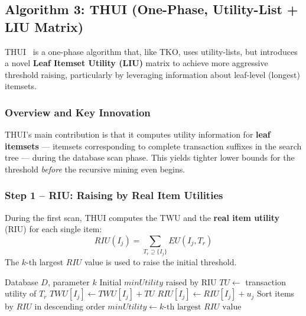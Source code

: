 \subsection{Algorithm 3: THUI (One-Phase, Utility-List + LIU Matrix)}
\label{sec:thui}

THUI~\cite{ref_thui} is a one-phase algorithm that, like TKO, uses utility-lists, but introduces a novel \textbf{Leaf Itemset Utility (LIU)} matrix to achieve more aggressive threshold raising, particularly by leveraging information about leaf-level (longest) itemsets.

\subsubsection{Overview and Key Innovation}

THUI's main contribution is that it computes utility information for \textbf{leaf itemsets} --- itemsets corresponding to complete transaction suffixes in the search tree --- during the database scan phase. This yields tighter lower bounds for the threshold \textit{before} the recursive mining even begins.

\subsubsection{Step 1 -- RIU: Raising by Real Item Utilities}

During the first scan, THUI computes the TWU and the \textbf{real item utility} (RIU) for each single item:
\begin{equation}
    RIU(I_j) = \sum_{T_r \supseteq \{I_j\}} EU(I_j, T_r)
\end{equation}
The $k$-th largest $RIU$ value is used to raise the initial threshold.

\begin{algorithm}[H]
\caption{RIU Computation --- First DB Scan (Ref: \texttt{thui/thui.go}, \texttt{firstScan}, lines 315--352)}
\label{alg:riu}
\begin{algorithmic}[1]
\Require Database $D$, parameter $k$
\Ensure Initial $minUtility$ raised by RIU
    \State $TU \leftarrow$ transaction utility of $T_r$
        \State $TWU[I_j] \leftarrow TWU[I_j] + TU$ 
        \State $RIU[I_j] \leftarrow RIU[I_j] + u_j$ 
    \EndFor
\EndFor
\State Sort items by $RIU$ in descending order
    \State $minUtility \leftarrow k\text{-th largest } RIU \text{ value}$
\EndIf
\end{algorithmic}
\end{algorithm}

